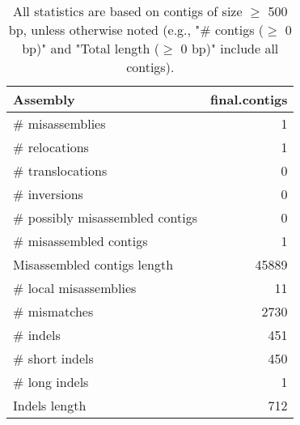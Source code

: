 \documentclass[12pt,a4paper]{article}
\begin{document}
\begin{table}[ht]
\begin{center}
\caption{All statistics are based on contigs of size $\geq$ 500 bp, unless otherwise noted (e.g., "\# contigs ($\geq$ 0 bp)" and "Total length ($\geq$ 0 bp)" include all contigs).}
\begin{tabular}{|l*{1}{|r}|}
\hline
Assembly & final.contigs \\ \hline
\# misassemblies & 1 \\ \hline
\hspace{5mm}\# relocations & 1 \\ \hline
\hspace{5mm}\# translocations & 0 \\ \hline
\hspace{5mm}\# inversions & 0 \\ \hline
\# possibly misassembled contigs & 0 \\ \hline
\# misassembled contigs & 1 \\ \hline
Misassembled contigs length & 45889 \\ \hline
\# local misassemblies & 11 \\ \hline
\# mismatches & 2730 \\ \hline
\# indels & 451 \\ \hline
\hspace{5mm}\# short indels & 450 \\ \hline
\hspace{5mm}\# long indels & 1 \\ \hline
Indels length & 712 \\ \hline
\end{tabular}
\end{center}
\end{table}
\end{document}
